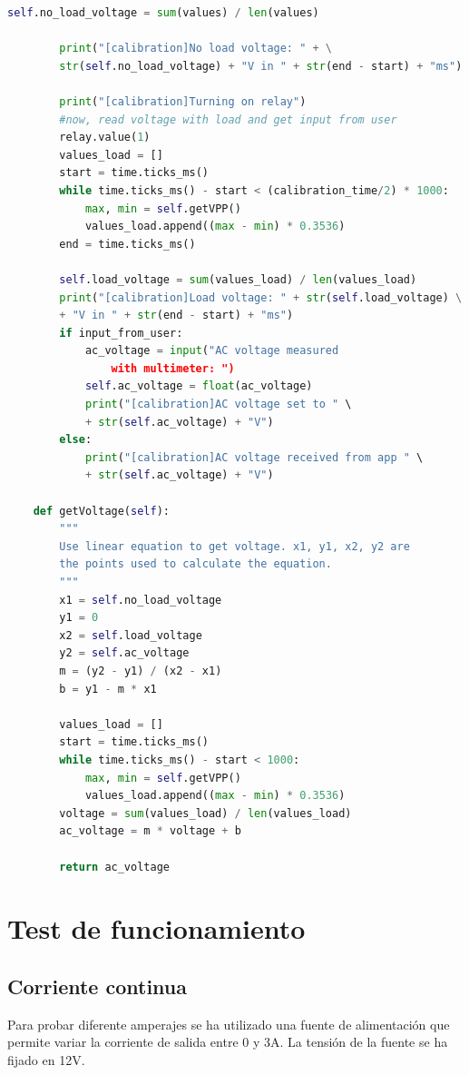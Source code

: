 \begin{titlepage}
\begin{lstlisting}[language=python]
		self.no_load_voltage = sum(values) / len(values)

		print("[calibration]No load voltage: " + \
		str(self.no_load_voltage) + "V in " + str(end - start) + "ms")
		
		print("[calibration]Turning on relay")
		#now, read voltage with load and get input from user
		relay.value(1)
		values_load = []
		start = time.ticks_ms()
		while time.ticks_ms() - start < (calibration_time/2) * 1000:
			max, min = self.getVPP()
			values_load.append((max - min) * 0.3536)
		end = time.ticks_ms()
		
		self.load_voltage = sum(values_load) / len(values_load)
		print("[calibration]Load voltage: " + str(self.load_voltage) \
		+ "V in " + str(end - start) + "ms")
		if input_from_user:
			ac_voltage = input("AC voltage measured 
				with multimeter: ")
			self.ac_voltage = float(ac_voltage)
			print("[calibration]AC voltage set to " \
			+ str(self.ac_voltage) + "V")
		else:
			print("[calibration]AC voltage received from app " \
			+ str(self.ac_voltage) + "V")
	
	def getVoltage(self):
		"""
		Use linear equation to get voltage. x1, y1, x2, y2 are
		the points used to calculate the equation.
		"""
		x1 = self.no_load_voltage
		y1 = 0
		x2 = self.load_voltage
		y2 = self.ac_voltage
		m = (y2 - y1) / (x2 - x1)
		b = y1 - m * x1

		values_load = []
		start = time.ticks_ms()
		while time.ticks_ms() - start < 1000:
			max, min = self.getVPP()
			values_load.append((max - min) * 0.3536)
		voltage = sum(values_load) / len(values_load)
		ac_voltage = m * voltage + b

		return ac_voltage
\end{lstlisting}

\section{Test de funcionamiento}
\subsection{Corriente continua}
Para probar diferente amperajes se ha utilizado una fuente de alimentación que permite variar la corriente de salida entre 0 y 3A. La tensión de la fuente se ha fijado en 12V.\\

\end{titlepage}
